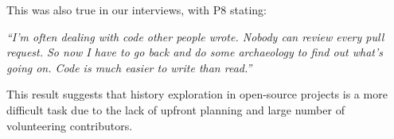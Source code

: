 This was also true in our interviews, with P8 stating:

\begin{quoting}
\textit{``I'm often dealing with code other people wrote. Nobody can review every pull request. So now I have to go back and do some archaeology to find out what's going on. Code is much easier to write than read.''}
\end{quoting}

This result suggests that history exploration in open-source projects is a more difficult task due to the lack of upfront planning and large number of volunteering contributors.
